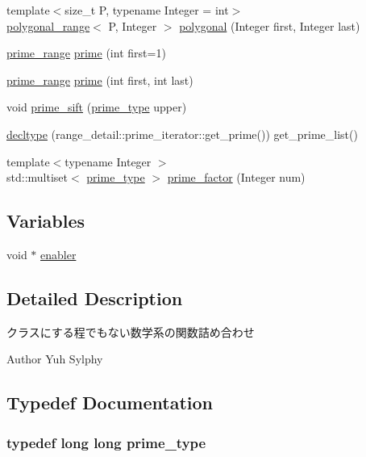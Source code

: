 \begin{DoxyCompactItemize}
\item 
{\footnotesize template$<$size\-\_\-t \-P, typename Integer  = int$>$ }\\\hyperlink{classyuh_1_1polygonal__range}{polygonal\-\_\-range}$<$ \-P, \-Integer $>$ \hyperlink{namespaceyuh_a1af8d0faca38b0efb8ae71d0f773d3c8}{polygonal} (\-Integer first, \-Integer last)
\item 
\hyperlink{classyuh_1_1prime__range}{prime\-\_\-range} \hyperlink{namespaceyuh_ad0e08caa71b8e5172b1535657bbc0648}{prime} (int first=1)
\item 
\hyperlink{classyuh_1_1prime__range}{prime\-\_\-range} \hyperlink{namespaceyuh_a31e810e0c57ef83ca515b12f1aac0bf3}{prime} (int first, int last)
\item 
void \hyperlink{namespaceyuh_ac7fcc7fa46bf6b7cf12a53a653b23317}{prime\-\_\-sift} (\hyperlink{namespaceyuh_af542f8440602da42322ddb7ea8242336}{prime\-\_\-type} upper)
\item 
\hyperlink{namespaceyuh_aef8d22260a5c6af5f37d206badfd3d4e}{decltype} (range\-\_\-detail\-::prime\-\_\-iterator\-::get\-\_\-prime()) get\-\_\-prime\-\_\-list()
\item 
{\footnotesize template$<$typename Integer $>$ }\\std\-::multiset$<$ \hyperlink{namespaceyuh_af542f8440602da42322ddb7ea8242336}{prime\-\_\-type} $>$ \hyperlink{namespaceyuh_afb5d08e183729831f760d6c2a27226d8}{prime\-\_\-factor} (\-Integer num)
\end{DoxyCompactItemize}
\subsection*{\-Variables}
\begin{DoxyCompactItemize}
\item 
void $\ast$ \hyperlink{namespaceyuh_a8b379f3dbc4920262c249049dd41274d}{enabler}
\end{DoxyCompactItemize}


\subsection{\-Detailed \-Description}
クラスにする程でもない数学系の関数詰め合わせ \begin{DoxyAuthor}{\-Author}
\-Yuh \-Sylphy 
\end{DoxyAuthor}


\subsection{\-Typedef \-Documentation}
\hypertarget{namespaceyuh_af542f8440602da42322ddb7ea8242336}{
\subsubsection[{prime\-\_\-type}]{\setlength{\rightskip}{0pt plus 5cm}typedef long long {\bf prime\-\_\-type}}}\label{d5/d2b/namespaceyuh_af542f8440602da42322ddb7ea8242336}


